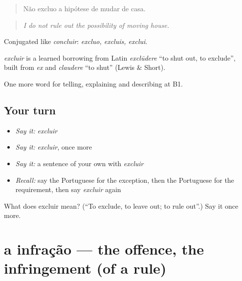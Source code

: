 \begin{quote}
Não excluo a hipótese de mudar de casa.
\end{quote}

\begin{quote}
\emph{I do not rule out the possibility of moving house.}
\end{quote}

Conjugated like \emph{concluir}: \emph{excluo, excluis, exclui}.

\begin{cousinweb}
\emph{excluir} is a learned borrowing from Latin \emph{exclūdere} \textquotedblleft{}to shut out, to exclude\textquotedblright{}, built from \emph{ex} and \emph{claudere} \textquotedblleft{}to shut\textquotedblright{} (Lewis \& Short).
\end{cousinweb}

\begin{grammarlens}[title={What you've built}]
One more word for telling, explaining and describing at B1.
\end{grammarlens}

\subsection*{Your turn}
\begin{itemize}
\raggedright
  \item \emph{Say it:} \emph{excluir}
  \item \emph{Say it:} \emph{excluir}, once more
  \item \emph{Say it:} a sentence of your own with \emph{excluir}
  \item \emph{Recall:} say the Portuguese for the exception, then the Portuguese for the requirement, then say \emph{excluir} again
\end{itemize}

\begin{tcolorbox}[breakable,colback=teal!4,colframe=teal!35!black,title={Before you move on}]
What does excluir mean? (\textquotedblleft{}To exclude, to leave out; to rule out\textquotedblright{}.) Say it once more.
\end{tcolorbox}
\section[a infração]{a infração — the offence, the infringement (of a rule)}

\label{lesson:PT-C383-infracao}




